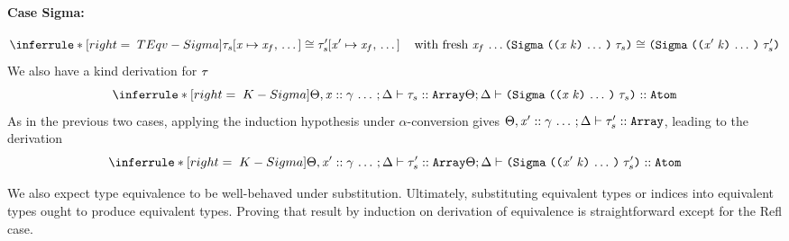 \begin{sproof}
  \paragraph{Case {\sc Sigma}:}
  \[{\infr[TEqv-Sigma]
    {\teqv
      {\seqsubst{\type_s}{\var}{\var_f}}
      {\seqsubst{\type_s'}{\var'}{\var_f}}
      \fresh{\sequence{\var_f}}}
    {\teqv
      {\typedsum{\sequence{\notevar{\var}{\kind}}}{\type_s}}
      {\typedsum{\sequence{\notevar{\var'}{\kind}}}{\type_s'}}}}\]
  We also have a kind derivation for $\mathit{\tau}$
  \[{\infr[K-Sigma]
    {\kindof{\sEnv, \sequence{\hassort{\var}{\sort}}}{\kEnv}
      {\type_s}
      {\kindarray}}
    {\kindof{\sEnv}{\kEnv}
      {\typedsum{\sequence{\notevar{\var}{\kind}}}{\type_s}}
      {\kindatom}}}\]
  As in the previous two cases,
  applying the induction hypothesis under $\alpha$-conversion gives
  $\Theta, \mathit{x}' :: \mathit{\gamma} \, \ldots \,;\Delta \vdash \mathit{\tau}_s' :: \text{\tt Array}$,
  leading to the derivation
  \[{\infr[K-Sigma]
    {\kindof{\sEnv, \sequence{\hassort{\var'}{\sort}}}{\kEnv}
      {\type_s'}
      {\kindarray}}
    {\kindof{\sEnv}{\kEnv}
      {\typedsum{\sequence{\notevar{\var'}{\kind}}}{\type_s'}}
      {\kindatom}}}\]
\end{sproof}

We also expect type equivalence to be well-behaved under substitution.
Ultimately, substituting equivalent types or indices into equivalent types
ought to produce equivalent types.
Proving that result by induction on derivation of equivalence is straightforward
except for the {\sc Refl} case.

